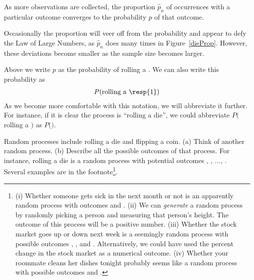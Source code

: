 \begin{termBox}{
As more observations are collected, the proportion $\hat{p}_n$ of occurrences with a particular outcome converges to the probability $p$ of that outcome.}
\end{termBox}

Occasionally the proportion will veer off from the probability and appear to defy the Law of Large Numbers, as $\hat{p}_n$ does many times in Figure~\ref{dieProp}. However, these deviations become smaller as the sample size becomes larger.

Above we write $p$ as the probability of rolling a . We can also write this probability as
\begin{eqnarray*}
P(\text{rolling a \resp{1}})
\end{eqnarray*}
As we become more comfortable with this notation, we will abbreviate it further. For instance, if it is clear the process is ``rolling a die'', we could abbreviate $P($rolling a $)$ as $P($$)$. 

\begin{exercise} \label{randomProcessExercise}
Random processes include rolling a die and flipping a coin. (a) Think of another random process. (b) Describe all the possible outcomes of that process. For instance, rolling a die is a random process with potential outcomes , , ..., . Several examples are in the footnote\footnote{(i) Whether someone gets sick in the next month or not is an apparently random process with outcomes  and . (ii) We can \emph{generate} a random process by randomly picking a person and measuring that person's height. The outcome of this process will be a positive number. (iii) Whether the stock market goes up or down next week is a seemingly random process with possible outcomes , , and . Alternatively, we could have used the percent change in the stock market as a numerical outcome. (iv) Whether your roommate cleans her dishes tonight probably seems like a random process with possible outcomes  and .}.
\end{exercise}

